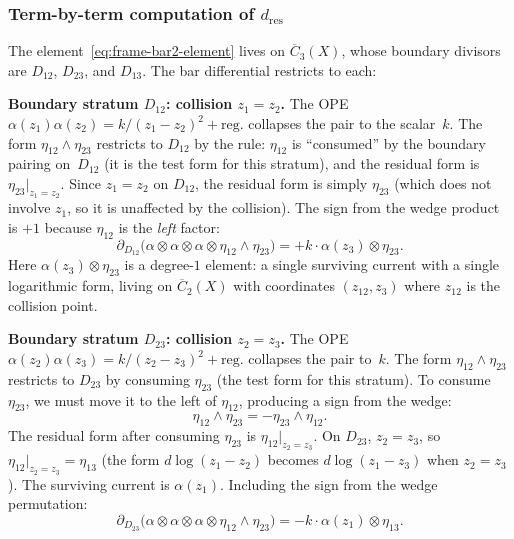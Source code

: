 \subsubsection*{Term-by-term computation of $d_{\mathrm{res}}$}

The element~\eqref{eq:frame-bar2-element} lives on
$\overline{C}_3(X)$, whose boundary divisors are $D_{12}$, $D_{23}$,
and $D_{13}$. The bar differential restricts to each:

\medskip
\noindent\textbf{Boundary stratum $D_{12}$: collision $z_1 = z_2$.}
The OPE $\alpha(z_1)\alpha(z_2) = k/(z_1 - z_2)^2 + \mathrm{reg.}$
collapses the pair to the scalar~$k$. The form
$\eta_{12} \wedge \eta_{23}$ restricts to $D_{12}$ by the rule:
$\eta_{12}$ is ``consumed'' by the boundary pairing
on~$D_{12}$ (it is the test form for this stratum), and the
residual form is $\eta_{23}|_{z_1 = z_2}$. Since $z_1 = z_2$
on $D_{12}$, the residual form is simply $\eta_{23}$ (which
does not involve $z_1$, so it is unaffected by the collision).
The sign from the wedge product is $+1$ because $\eta_{12}$ is
the \emph{left} factor:
\begin{equation}\label{eq:frame-D12-contribution}
\partial_{D_{12}}\bigl(
 \alpha \otimes \alpha \otimes \alpha \otimes
 \eta_{12} \wedge \eta_{23}
\bigr)
= +k \cdot \alpha(z_3) \otimes \eta_{23}.
\end{equation}
Here $\alpha(z_3) \otimes \eta_{23}$ is a degree-$1$
element: a single surviving current with a single logarithmic
form, living on $\overline{C}_2(X)$ with coordinates $(z_{12}, z_3)$
where $z_{12}$ is the collision point.

\medskip
\noindent\textbf{Boundary stratum $D_{23}$: collision $z_2 = z_3$.}
The OPE $\alpha(z_2)\alpha(z_3) = k/(z_2 - z_3)^2 + \mathrm{reg.}$
collapses the pair to~$k$. The form $\eta_{12} \wedge \eta_{23}$
restricts to $D_{23}$ by consuming $\eta_{23}$ (the test form
for this stratum). To consume $\eta_{23}$, we must move it to
the left of $\eta_{12}$, producing a sign from the wedge:
\[
\eta_{12} \wedge \eta_{23} = -\eta_{23} \wedge \eta_{12}.
\]
The residual form after consuming $\eta_{23}$ is $\eta_{12}|_{z_2 = z_3}$.
On $D_{23}$, $z_2 = z_3$, so $\eta_{12}|_{z_2 = z_3} = \eta_{13}$
(the form $d\log(z_1 - z_2)$ becomes $d\log(z_1 - z_3)$
when $z_2 = z_3$). The surviving current is $\alpha(z_1)$.
Including the sign from the wedge permutation:
\begin{equation}\label{eq:frame-D23-contribution}
\partial_{D_{23}}\bigl(
 \alpha \otimes \alpha \otimes \alpha \otimes
 \eta_{12} \wedge \eta_{23}
\bigr)
= -k \cdot \alpha(z_1) \otimes \eta_{13}.
\end{equation}

